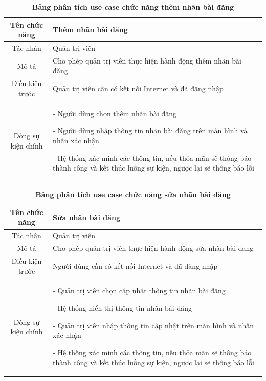   \begin{table}[H]
    \caption{\bfseries \fontsize{12pt}{0pt}\selectfont Bảng phân tích use case chức năng thêm nhãn bài đăng}
    \centering
    \begin{tabularx}{0.9\textwidth}{|c|X|}
      \hline
      \textbf{Tên chức năng} & \textbf{Thêm nhãn bài đăng} \\
      \hline
      Tác nhân & Quản trị viên \\
      \hline
      Mô tả & Cho phép quản trị viên thực hiện hành động thêm nhãn bài đăng \\
      \hline
      Điều kiện trước & Quản trị viên cần có kết nối Internet và đã đăng nhập \\
      \hline
      Dòng sự kiện chính & 
        - Người dùng chọn thêm nhãn bài đăng

        - Người dùng nhập thông tin nhãn bài đăng trên màn hình và nhấn xác nhận

        - Hệ thống xác minh các thông tin, nếu thỏa mãn sẽ thông báo thành công và kết thúc luồng sự kiện, ngược lại 
        sẽ thông báo lỗi         
        \\
      \hline
    \end{tabularx}
  \end{table}

  \begin{table}[H]
    \caption{\bfseries \fontsize{12pt}{0pt}\selectfont Bảng phân tích use case chức năng sửa nhãn bài đăng}
    \centering
    \begin{tabularx}{0.9\textwidth}{|c|X|}
      \hline
      \textbf{Tên chức năng} & \textbf{Sửa nhãn bài đăng} \\
      \hline
      Tác nhân & Quản trị viên \\
      \hline
      Mô tả & Cho phép quản trị viên thực hiện hành động sửa nhãn bài đăng \\
      \hline
      Điều kiện trước & Người dùng cần có kết nối Internet và đã đăng nhập \\
      \hline
      Dòng sự kiện chính & 
        - Quản trị viên chọn cập nhật thông tin nhãn bài đăng

        - Hệ thống hiển thị thông tin nhãn bài đăng

        - Quản trị viên nhập thông tin cập nhật trên màn hình và nhấn xác nhận

        - Hệ thống xác minh các thông tin, nếu thỏa mãn sẽ thông báo thành công và kết thúc luồng sự kiện, ngược lại 
        sẽ thông báo lỗi         
        \\
      \hline
    \end{tabularx}
  \end{table}

